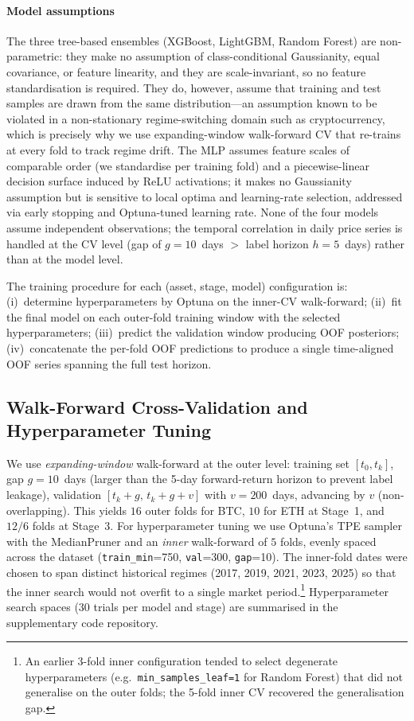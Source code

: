 \documentclass[conference]{IEEEtran}
\begin{document}
\paragraph*{Model assumptions} The three tree-based ensembles (XGBoost, LightGBM, Random Forest) are non-parametric: they make no assumption of class-conditional Gaussianity, equal covariance, or feature linearity, and they are scale-invariant, so no feature standardisation is required. They do, however, assume that training and test samples are drawn from the same distribution---an assumption known to be violated in a non-stationary regime-switching domain such as cryptocurrency, which is precisely why we use expanding-window walk-forward CV that re-trains at every fold to track regime drift. The MLP assumes feature scales of comparable order (we standardise per training fold) and a piecewise-linear decision surface induced by ReLU activations; it makes no Gaussianity assumption but is sensitive to local optima and learning-rate selection, addressed via early stopping and Optuna-tuned learning rate. None of the four models assume independent observations; the temporal correlation in daily price series is handled at the CV level (gap of $g=10$~days $>$ label horizon $h=5$~days) rather than at the model level.

The training procedure for each (asset, stage, model) configuration is: (i)~determine hyperparameters by Optuna on the inner-CV walk-forward; (ii)~fit the final model on each outer-fold training window with the selected hyperparameters; (iii)~predict the validation window producing OOF posteriors; (iv)~concatenate the per-fold OOF predictions to produce a single time-aligned OOF series spanning the full test horizon.

\subsection{Walk-Forward Cross-Validation and Hyperparameter Tuning}
We use \emph{expanding-window} walk-forward at the outer level: training set $[t_0, t_k]$, gap $g=10$~days (larger than the 5-day forward-return horizon to prevent label leakage), validation $[t_k+g,\, t_k+g+v]$ with $v=200$~days, advancing by $v$ (non-overlapping). This yields $16$ outer folds for BTC, $10$ for ETH at Stage~1, and $12/6$ folds at Stage~3. For hyperparameter tuning we use Optuna's TPE sampler with the MedianPruner and an \emph{inner} walk-forward of $5$ folds, evenly spaced across the dataset (\texttt{train\_min}=750, \texttt{val}=300, \texttt{gap}=10). The inner-fold dates were chosen to span distinct historical regimes (2017, 2019, 2021, 2023, 2025) so that the inner search would not overfit to a single market period.\footnote{An earlier 3-fold inner configuration tended to select degenerate hyperparameters (e.g.~\texttt{min\_samples\_leaf=1} for Random Forest) that did not generalise on the outer folds; the 5-fold inner CV recovered the generalisation gap.} Hyperparameter search spaces (30 trials per model and stage) are summarised in the supplementary code repository.
\end{document}

